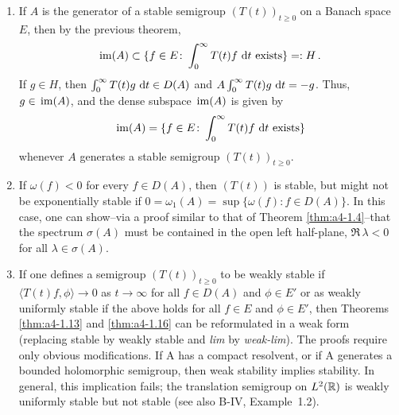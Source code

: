 \begin{remark}\label{rem:a4-1.17}
\begin{enumerate}[\upshape (i), wide, labelindent=.5em]
\item 
If $A$ is the generator of a stable semigroup
$(T(t))_{t \geq 0}$ on a Banach space $E$, then by the previous theorem,
\[{
\mathop{}\mathrm{im}(A) \subset \{f \in E\colon\int_{0}^{\infty} T(t)f \,\mathop{}\!\mathrm{d}{t} \text{ exists}\} =: H\,.
}\]
If $g \in H$, then $\int_{0}^{\infty} T(t)g \,\mathop{}\!\mathrm{d}{t} \in D(A)$ and $A \int_{0}^{\infty} T(t)g \,\mathop{}\!\mathrm{d}{t} = -g$. 
Thus, $g \in \mathop{}\mathrm{im}(A)$, and  the dense subspace $\mathop{}\mathrm{im}(A)$ is given
by
\begin{equation}\label{eq:a4-1.14}
\mathop{}\mathrm{im}(A) = \{f \in E\colon\int_{0}^{\infty} T(t)f \,\mathop{}\!\mathrm{d}{t} \text{ exists}\}
\end{equation}
whenever $A$ generates a stable semigroup $(T(t))_{t \geq 0}$.

\item 
If $\omega(f) < 0$ for every $f \in D(A)$, then $(T(t))$ is stable, but
might not be exponentially stable if
$0 = \omega_{1}(A) = \sup\{\omega(f) \colon f \in D(A)\}$. 
In this case, one can show--via a
proof similar to that of Theorem \ref{thm:a4-1.4}--that the spectrum $\sigma(A)$ must be contained
in the open left half-plane, \ie $\Re\,\lambda < 0$ for all $\lambda \in \sigma(A)$.

\item 
If one defines a semigroup $(T(t))_{t \geq 0}$ to be weakly stable if
$\langle T(t)f,\phi \rangle \to 0$ as $t \to \infty$ for all $f \in D(A)$ and $\phi \in E'$ or as
weakly uniformly stable if the above holds  for all $f \in E$
and $\phi \in E'$, then Theorems \ref{thm:a4-1.13} and \ref{thm:a4-1.16} can be reformulated in a weak form (\ie  replacing stable by weakly stable and \emph{lim} by
\emph{weak-lim}). 
The proofs require only obvious modifications.
If A has a compact resolvent, or if A generates a bounded
holomorphic semigroup, then weak stability implies stability. 
In general, this implication fails; \eg the translation semigroup on
$L^{2}(\mathbb{R})$ is weakly uniformly stable but not stable (see also B-IV, Example~1.2).
\end{enumerate}
\end{remark}
